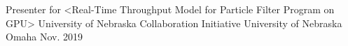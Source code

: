 

\begin{cventries}

  \cventry
    {Presenter for <Real-Time Throughput Model for Particle Filter Program on GPU>} %
    {University of Nebraska Collaboration Initiative} %
    {University of Nebraska Omaha} %
    {Nov. 2019} %
    {
    }


\end{cventries}

